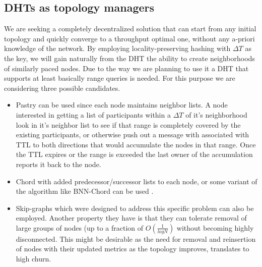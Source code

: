 \documentclass[12pt,notitlepage]{article}
\begin{document}
\subsection{DHTs as topology managers}
We are seeking a completely decentralized solution that can start from any 
initial topology and quickly converge to a throughput optimal one, without
any a-priori knowledge of the network. By employing locality-preserving hashing
with $\Delta T$ as the key, we will gain naturally from the DHT the ability to
create neighborhoods of similarly paced nodes. Due to the way we are planning
to use it a DHT that supports at least basically range queries is needed.
For this purpose we are considering three possible candidates. 
\begin{itemize}
\item Pastry can be used since each node maintains neighbor lists. A node 
interested in getting a list of participants within a $\Delta T$ of it's
neighborhood look in it's neighbor list to see if that range is completely 
covered by the existing participants, or otherwise push out a message with
associated with TTL to both directions that would accumulate the nodes in that
range. Once the TTL expires or the range is exceeded the last owner of the
accumulation reports it back to the node. 

\item Chord with added predecessor/successor lists to each
node, or some variant of the algorithm like BNN-Chord can be used 
\cite{bnn-chord}.

\item Skip-graphs \cite{skip-graphs} which were designed to address this 
specific problem can also be employed. Another property they have is that
they can tolerate removal of large groups of nodes (up to a fraction of 
$O(\frac{1}{log N})$ without becoming highly disconnected. This might be
desirable as the need for removal and reinsertion of nodes with their
updated metrics as the topology improves, translates to high churn.
\end{itemize}
\end{document}
